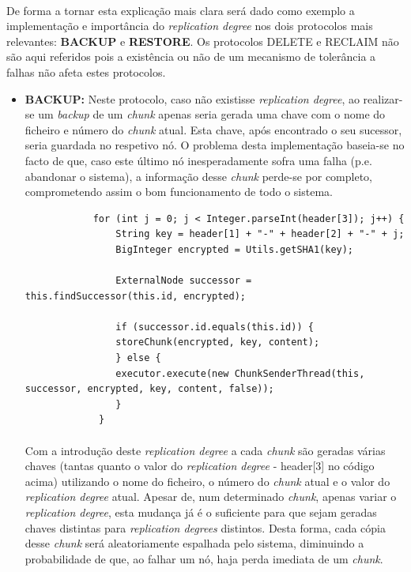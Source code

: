 \documentclass[11pt,oneside]{book}
\begin{document}
    \paragraph{}
    De forma a tornar esta explicação mais clara será dado como exemplo a implementação e
    importância do \textit{replication degree} nos dois protocolos mais relevantes: \textbf{BACKUP} 
    e \textbf{RESTORE}. Os protocolos DELETE e RECLAIM não são aqui referidos pois a existência 
    ou não de um mecanismo de tolerância a falhas não afeta estes protocolos.
    \begin{itemize}
        \item \textbf{BACKUP:} Neste protocolo, caso não existisse \textit{replication degree}, 
        ao realizar-se um \textit{backup} de um \textit{chunk} apenas seria gerada uma chave com o nome 
        do ficheiro e número do \textit{chunk} atual. Esta chave, após encontrado o seu sucessor,
        seria guardada no respetivo nó. O problema desta implementação baseia-se no facto de que,
        caso este último nó inesperadamente sofra uma falha (p.e. abandonar o sistema), a informação
        desse \textit{chunk} perde-se por completo, comprometendo assim o bom funcionamento de todo o sistema.
        
        \begin{lstlisting}
            for (int j = 0; j < Integer.parseInt(header[3]); j++) {
                String key = header[1] + "-" + header[2] + "-" + j;
                BigInteger encrypted = Utils.getSHA1(key);

                ExternalNode successor = this.findSuccessor(this.id, encrypted);

                if (successor.id.equals(this.id)) {
                storeChunk(encrypted, key, content);
                } else {
                executor.execute(new ChunkSenderThread(this, successor, encrypted, key, content, false));
                }
             }
        \end{lstlisting}
        
        \paragraph{}
            Com a introdução deste \textit{replication degree} a cada \textit{chunk} são geradas 
            várias chaves (tantas quanto o valor do \textit{replication degree} - header[3] no 
            código acima) utilizando o nome  do ficheiro, o número do \textit{chunk} atual e o 
            valor do \textit{replication degree} atual.
            Apesar de, num determinado \textit{chunk}, apenas variar o \textit{replication degree},
            esta mudança já é o suficiente para que sejam geradas chaves distintas para 
            \textit{replication degrees} distintos. Desta forma, cada cópia desse \textit{chunk} 
            será aleatoriamente espalhada pelo sistema, diminuindo a probabilidade de que, ao 
            falhar um nó, haja perda imediata de um \textit{chunk}.
        

\end{itemize}
\end{document}
